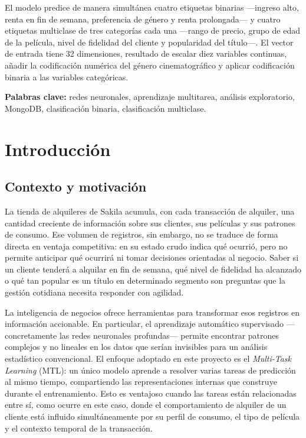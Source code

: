 \documentclass[12pt, a4paper]{report}
\newcommand{\ingles}[1]{\textit{#1}}
\begin{document}
El modelo predice de manera simultánea cuatro etiquetas binarias ---ingreso alto, renta en fin de semana, preferencia de género y renta prolongada--- y cuatro etiquetas multiclase de tres categorías cada una ---rango de precio, grupo de edad de la película, nivel de fidelidad del cliente y popularidad del título---. El vector de entrada tiene 32 dimensiones, resultado de escalar diez variables continuas, añadir la codificación numérica del género cinematográfico y aplicar codificación binaria a las variables categóricas.

\vspace{0.4em}
\noindent\textbf{Palabras clave:} redes neuronales, aprendizaje multitarea, análisis exploratorio, MongoDB, clasificación binaria, clasificación multiclase.

\tableofcontents
\listoffigures
\listoftables
\newpage

\chapter{Introducción}

\section{Contexto y motivación}

La tienda de alquileres de Sakila acumula, con cada transacción de alquiler, una cantidad creciente de información sobre sus clientes, sus películas y sus patrones de consumo. Ese volumen de registros, sin embargo, no se traduce de forma directa en ventaja competitiva: en su estado crudo indica qué ocurrió, pero no permite anticipar qué ocurrirá ni tomar decisiones orientadas al negocio. Saber si un cliente tenderá a alquilar en fin de semana, qué nivel de fidelidad ha alcanzado o qué tan popular es un título en determinado segmento son preguntas que la gestión cotidiana necesita responder con agilidad.

La inteligencia de negocios ofrece herramientas para transformar esos registros en información accionable. En particular, el aprendizaje automático supervisado ---concretamente las redes neuronales profundas--- permite encontrar patrones complejos y no lineales en los datos que serían invisibles para un análisis estadístico convencional. El enfoque adoptado en este proyecto es el \ingles{Multi-Task Learning} (MTL): un único modelo aprende a resolver varias tareas de predicción al mismo tiempo, compartiendo las representaciones internas que construye durante el entrenamiento. Esto es ventajoso cuando las tareas están relacionadas entre sí, como ocurre en este caso, donde el comportamiento de alquiler de un cliente está influido simultáneamente por su perfil de consumo, el tipo de película y el contexto temporal de la transacción.
\end{document}
